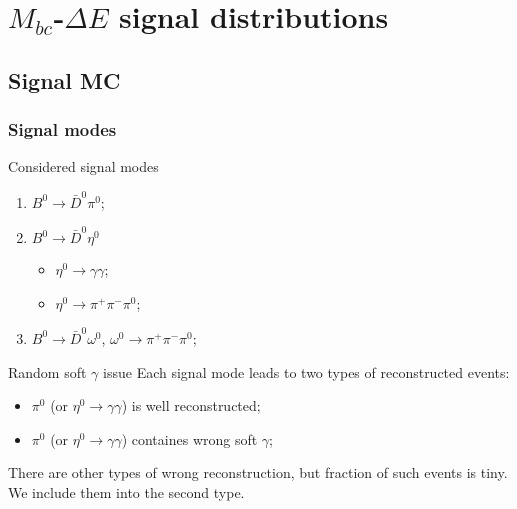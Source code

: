 \documentclass[10 pt,compress,mathserif]{beamer}
\newcommand{\bdpi}{\ensuremath{B^0\to \bar D^0\pi^0}\xspace}
\newcommand{\bdeta}{\ensuremath{B^0\to \bar D^0\eta^0}\xspace}
\newcommand{\etagg}{\ensuremath{\eta^0\to \gamma\gamma}\xspace}
\newcommand{\etappp}{\ensuremath{\eta^0\to \pi^+\pi^-\pi^0}\xspace}
\newcommand{\bdomega}{\ensuremath{B^0\to \bar D^0\omega^0}\xspace}
\newcommand{\omegappp}{\ensuremath{\omega^0\to \pi^+\pi^-\pi^0}\xspace}
\begin{document}
\section{$M_{bc}$-$\Delta E$ signal distributions}
\frame{\tableofcontents[current]}
\subsection{Signal MC}
\begin{frame}
 \frametitle{Signal modes}
 \begin{block}{Considered signal modes}
 \begin{enumerate}
  \item \bdpi;
  \item \bdeta
  \begin{itemize}
   \item \etagg;
   \item \etappp;
  \end{itemize}
  \item \bdomega, \omegappp;
 \end{enumerate}
 \end{block}

 \begin{block}{Random soft $\gamma$ issue}
 Each signal mode leads to two types of reconstructed events:
  \begin{itemize}
   \item $\pi^0$ (or \etagg) is well reconstructed;
   \item $\pi^0$ (or \etagg) containes wrong soft $\gamma$;
  \end{itemize}
  There are other types of wrong reconstruction, but fraction of such events is tiny. We include them into the second type.
 \end{block}
\end{frame}
\end{document}
